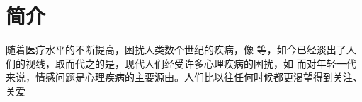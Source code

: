 
\chapter{简介}
随着医疗水平的不断提高，困扰人类数个世纪的疾病，像 等，如今已经淡出了人们的视线，取而代之的是，现代人们经受许多心理疾病的困扰，如
而对年轻一代来说，情感问题是心理疾病的主要源由。人们比以往任何时候都更渴望得到关注、关爱\cite{zhang2019gao}